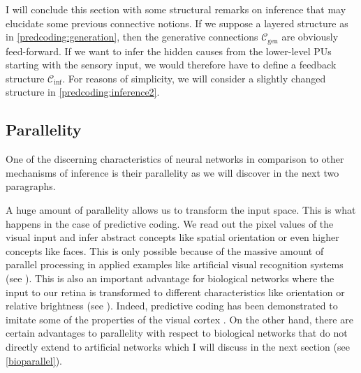 \documentclass[a4paper,11pt]{article}
\begin{document}
\begin{Abs}\label{predcoding:inference1}
I will conclude this section with some structural remarks on inference that may elucidate some previous connective notions. If we suppose a layered structure as in \ref{predcoding:generation}, then the generative  connections $\mathcal{C}_{\text{gen}}$ are obviously feed-forward. If we want to infer the hidden causes from the lower-level PUs starting with the sensory input, we would therefore have to define a feedback structure $\mathcal{C}_{\text{inf}}$. For reasons of simplicity, we will consider a slightly changed structure in \ref{predcoding:inference2}.
\end{Abs}
\subsection{Parallelity}
\begin{Abs}
One of the discerning characteristics of neural networks in comparison to other mechanisms of inference is their parallelity as we will discover in the next two paragraphs.
\end{Abs}
\begin{Abs}[Transformations]\label{artparallel}
A huge amount of parallelity allows us to transform the input space. This is what happens in the case of predictive coding. We read out the pixel values of the visual input and infer abstract concepts like spatial orientation or even higher concepts like faces. This is only possible because of the massive amount of parallel processing in applied examples like artificial visual recognition systems (see \cite[][70-73]{Rojas1996}). This is also an important advantage for biological networks where the input to our retina is transformed to different characteristics like orientation or relative brightness (see \cite[][257-276]{Purves2012}). Indeed, predictive coding has been demonstrated to imitate some of the properties of the visual cortex \cite{Rao1999}. On the other hand, there are certain advantages to parallelity with respect to biological networks that do not directly extend to artificial networks which I will discuss in the next section (see \ref{bioparallel}).
\end{Abs}
\end{document}
